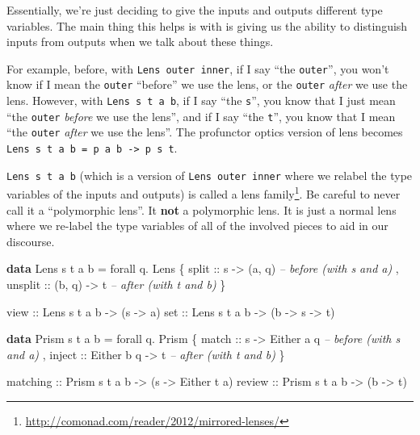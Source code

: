 \documentclass[]{article}
\newenvironment{Shaded}{}{}
\newcommand{\CommentTok}[1]{\textcolor[rgb]{0.38,0.63,0.69}{\textit{#1}}}
\newcommand{\DataTypeTok}[1]{\textcolor[rgb]{0.56,0.13,0.00}{#1}}
\newcommand{\FunctionTok}[1]{\textcolor[rgb]{0.02,0.16,0.49}{#1}}
\newcommand{\KeywordTok}[1]{\textcolor[rgb]{0.00,0.44,0.13}{\textbf{#1}}}
\newcommand{\NormalTok}[1]{#1}
\newcommand{\OtherTok}[1]{\textcolor[rgb]{0.00,0.44,0.13}{#1}}
\renewcommand{\href}[2]{#2\footnote{\url{#1}}}
\begin{document}
Essentially, we're just deciding to give the inputs and outputs different type
variables. The main thing this helps is with is giving us the ability to
distinguish inputs from outputs when we talk about these things.

For example, before, with \texttt{Lens\textquotesingle{}\ outer\ inner}, if I
say ``the \texttt{outer}'', you won't know if I mean the \texttt{outer}
``before'' we use the lens, or the \texttt{outer} \emph{after} we use the lens.
However, with \texttt{Lens\ s\ t\ a\ b}, if I say ``the \texttt{s}'', you know
that I just mean ``the \texttt{outer} \emph{before} we use the lens'', and if I
say ``the \texttt{t}'', you know that I mean ``the \texttt{outer} \emph{after}
we use the lens''. The profunctor optics version of lens becomes
\texttt{Lens\ s\ t\ a\ b\ =\ p\ a\ b\ -\textgreater{}\ p\ s\ t}.

\texttt{Lens\ s\ t\ a\ b} (which is a version of
\texttt{Lens\textquotesingle{}\ outer\ inner} where we relabel the type
variables of the inputs and outputs) is called a
\href{http://comonad.com/reader/2012/mirrored-lenses/}{lens family}. Be careful
to never call it a ``polymorphic lens''. It \textbf{not} a polymorphic lens. It
is just a normal lens where we re-label the type variables of all of the
involved pieces to aid in our discourse.

\begin{Shaded}
\begin{Highlighting}[]
\KeywordTok{data} \DataTypeTok{Lens}\NormalTok{ s t a b }\FunctionTok{=}\NormalTok{ forall q}\FunctionTok{.} \DataTypeTok{Lens}
\NormalTok{    \{}\OtherTok{ split   ::}\NormalTok{ s }\OtherTok{->}\NormalTok{ (a, q)        }\CommentTok{-- before (with s and a)}
\NormalTok{    ,}\OtherTok{ unsplit ::}\NormalTok{ (b, q) }\OtherTok{->}\NormalTok{ t        }\CommentTok{-- after  (with t and b)}
\NormalTok{    \}}

\OtherTok{view ::} \DataTypeTok{Lens}\NormalTok{ s t a b }\OtherTok{->}\NormalTok{ (s }\OtherTok{->}\NormalTok{ a)}
\OtherTok{set  ::} \DataTypeTok{Lens}\NormalTok{ s t a b }\OtherTok{->}\NormalTok{ (b }\OtherTok{->}\NormalTok{ s }\OtherTok{->}\NormalTok{ t)}

\KeywordTok{data} \DataTypeTok{Prism}\NormalTok{ s t a b }\FunctionTok{=}\NormalTok{ forall q}\FunctionTok{.} \DataTypeTok{Prism}
\NormalTok{    \{}\OtherTok{ match  ::}\NormalTok{ s }\OtherTok{->} \DataTypeTok{Either}\NormalTok{ a q     }\CommentTok{-- before (with s and a)}
\NormalTok{    ,}\OtherTok{ inject ::} \DataTypeTok{Either}\NormalTok{ b q }\OtherTok{->}\NormalTok{ t     }\CommentTok{-- after  (with t and b)}
\NormalTok{    \}}


\OtherTok{matching ::} \DataTypeTok{Prism}\NormalTok{ s t a b }\OtherTok{->}\NormalTok{ (s }\OtherTok{->} \DataTypeTok{Either}\NormalTok{ t a)}
\OtherTok{review   ::} \DataTypeTok{Prism}\NormalTok{ s t a b }\OtherTok{->}\NormalTok{ (b }\OtherTok{->}\NormalTok{ t)}
\end{Highlighting}
\end{Shaded}
\end{document}
